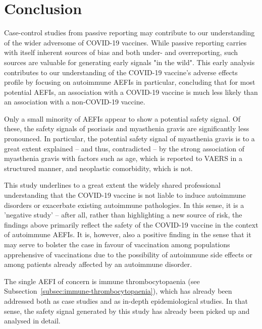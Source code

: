 \documentclass{article}
\begin{document}
\section{Conclusion}

Case-control studies from passive reporting may contribute to our understanding of the wider adversome of COVID-19 vaccines.
While passive reporting carries with itself inherent sources of bias and both under- and overreporting, such sources are valuable for generating early signals "in the wild".
This early analysis contributes to our understanding of the COVID-19 vaccine's adverse effects profile by focusing on autoimmune AEFIs in particular, concluding that for most potential AEFIs, an association with a COVID-19 vaccine is much less likely than an association with a non-COVID-19 vaccine.

Only a small minority of AEFIs appear to show a potential safety signal.
Of these, the safety signals of psoriasis and myasthenia gravis are significantly less pronounced.
In particular, the potential safety signal of myasthenia gravis is to a great extent explained -- and thus, contradicted -- by the strong association of myasthenia gravis with factors such as age, which is reported to VAERS in a structured manner, and neoplastic comorbidity, which is not.

This study underlines to a great extent the widely shared professional understanding that the COVID-19 vaccine is not liable to induce autoimmune disorders or exacerbate existing autoimmune pathologies.\cite{soy2021practical,ali2021covid,furer2021point}
In this sense, it is a 'negative study'\cite{doi:10.1056/NEJM200102013440509} -- after all, rather than highlighting a new source of risk, the findings above primarily reflect the safety of the COVID-19 vaccine in the context of autoimmune AEFIs.
It is, however, also a positive finding in the sense that it may serve to bolster the case in favour of vaccination among populations apprehensive of vaccinations due to the possibility of autoimmune side effects or among patients already affected by an autoimmune disorder.

The single AEFI of concern is immune thrombocytopaenia (see Subsection~\ref{subsec:immune-thrombocytopaenia}), which has already been addressed both as case studies\cite{xie2021covid,tarawneh2021immune,tiede2021prothrombotic,pai2021vaccine} and as in-depth epidemiological studies.\cite{WELSH20213329}
In that sense, the safety signal generated by this study has already been picked up and analysed in detail.
\end{document}
